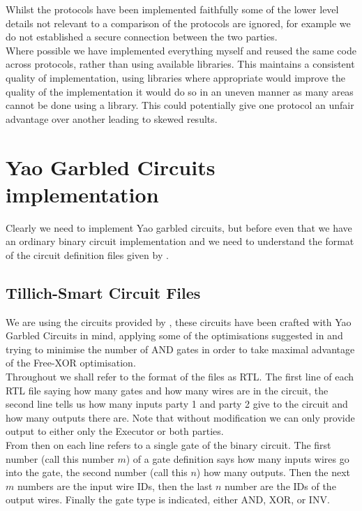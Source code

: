 \documentclass[ %
                    author={Nicholas Tutte},
                supervisor={Prof. Nigel Smart},
                    degree={MEng},
                     title={Secure Two Party Computation},
                  subtitle={A practical comparison of recent protocols},
                      type={Research - GG1K},
                      year={2015} ]{dissertation}
\begin{document}
			Whilst the protocols have been implemented faithfully some of the lower level details not relevant to a comparison of the protocols are ignored, for example we do not established a secure connection between the two parties.\\

			Where possible we have implemented everything myself and reused the same code across protocols, rather than using available libraries. This maintains a consistent quality of implementation, using libraries where appropriate would improve the quality of the implementation it would do so in an uneven manner as many areas cannot be done using a library. This could potentially give one protocol an unfair advantage over another leading to skewed results.

		\section{Yao Garbled Circuits implementation}

			Clearly we need to implement Yao garbled circuits, but before even that we have an ordinary binary circuit implementation and we need to understand the format of the circuit definition files given by \cite{NigelCircuits}.

			\subsection{Tillich-Smart Circuit Files}

				We are using the circuits provided by \cite{NigelCircuits}, these circuits have been crafted with Yao Garbled Circuits in mind, applying some of the optimisations suggested in \cite{SMC_Is_Practical} and trying to minimise the number of AND gates in order to take maximal advantage of the Free-XOR optimisation.\\

				Throughout we shall refer to the format of the files as RTL. The first line of each RTL file saying how many gates and how many wires are in the circuit, the second line tells us how many inputs party 1 and party 2 give to the circuit and how many outputs there are. Note that without modification we can only provide output to either only the Executor or both parties.\\

				From then on each line refers to a single gate of the binary circuit. The first number (call this number $m$) of a gate definition says how many inputs wires go into the gate, the second number (call this $n$) how many outputs. Then the next $m$ numbers are the input wire IDs, then the last $n$ number are the IDs of the output wires. Finally the gate type is indicated, either AND, XOR, or INV.\\
\end{document}
